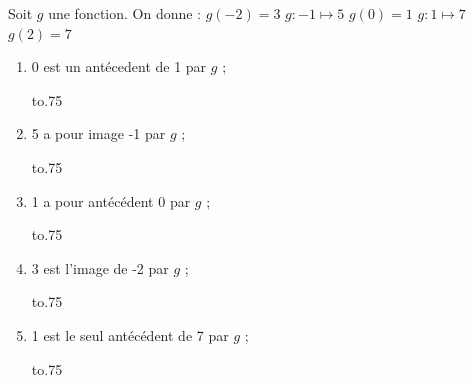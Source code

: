 \documentclass[exercice]{thedocument}%
\begin{document}
%
Soit $g$ une fonction. On donne :\qquad
$g(-2)=3$\qquad
$g:-1\mapsto5$\qquad
$g(0)=1$\qquad
$g:1\mapsto7$\qquad
$g(2)=7$\qquad
\begin{enumerate}
    \item 0 est un antécedent de 1 par $g$ ;\par\noindent\hbox to.75\linewidth{$\square$\quad VRAI\hfill$\square$\quad FAUX\hfill$\square$\quad On ne peut pas savoir}
    \item 5 a pour image -1 par $g$ ;\par\noindent\hbox to.75\linewidth{$\square$\quad VRAI\hfill$\square$\quad FAUX\hfill$\square$\quad On ne peut pas savoir}
    \item 1 a pour antécédent 0 par $g$ ;\par\noindent\hbox to.75\linewidth{$\square$\quad VRAI\hfill$\square$\quad FAUX\hfill$\square$\quad On ne peut pas savoir}
    \item 3 est l'image de -2 par $g$ ;\par\noindent\hbox to.75\linewidth{$\square$\quad VRAI\hfill$\square$\quad FAUX\hfill$\square$\quad On ne peut pas savoir}
    \item 1 est le seul antécédent de 7 par $g$ ;\par\noindent\hbox to.75\linewidth{$\square$\quad VRAI\hfill$\square$\quad FAUX\hfill$\square$\quad On ne peut pas savoir}
\end{enumerate}
\end{document}

